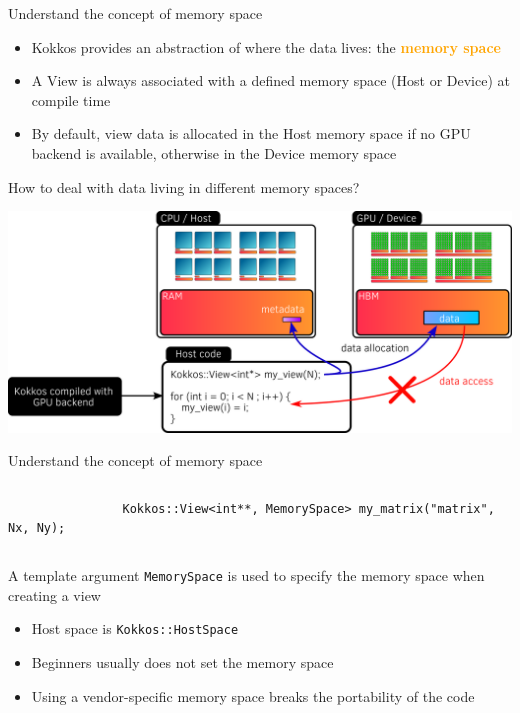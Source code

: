 \documentclass[aspectratio=169]{beamer}
\newcommand{\highlight}[1]{\textcolor{orange}{\textbf{#1}}}
\begin{document}

\begin{frame}{Understand the concept of memory space}
    \begin{itemize}
        \item Kokkos provides an abstraction of where the data lives: the \highlight{memory space}
        \item A View is always associated with a defined memory space (Host or Device) at compile time
        \item By default, view data is allocated in the Host memory space if no GPU backend is available, otherwise in the Device memory space
    \end{itemize}
\end{frame}


\begin{frame}{How to deal with data living in different memory spaces?}
    \begin{center}
        \includegraphics[width=\textwidth]{device_memory_access.png}
    \end{center}
\end{frame}


\begin{frame}[fragile]{Understand the concept of memory space}
    \begin{columns}
        \begin{column}{0.6\linewidth}
            \begin{verbatim}
                Kokkos::View<int**, MemorySpace> my_matrix("matrix", Nx, Ny);
            \end{verbatim}
        \end{column}
    \end{columns}
    A template argument \texttt{MemorySpace} is used to specify the memory space when creating a view


    \begin{itemize}
        \item Host space is \texttt{Kokkos::HostSpace}
        \item Beginners usually does not set the memory space
        \item Using a vendor-specific memory space breaks the portability of the code
    \end{itemize}
\end{frame}
\end{document}
